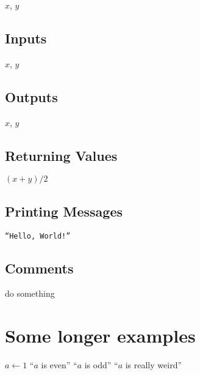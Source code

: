 \documentclass{amsart}
\begin{document}
\begin{algorithmic}[1]
    \GLOBALS $x$, $y$
\end{algorithmic}

\subsection{Inputs}

\begin{algorithmic}[1]
    \INPUTS
        \STATE $x$, $y$
    \ENDINPUTS
\end{algorithmic}

\subsection{Outputs}

\begin{algorithmic}[1]
    \OUTPUTS
        \STATE $x$, $y$
    \ENDOUTPUTS
\end{algorithmic}

\subsection{Returning Values}

\begin{algorithmic}[1]
\RETURN $(x+y)/2$
\end{algorithmic}

\subsection{Printing Messages}

\begin{algorithmic}[1]
\PRINT \texttt{``Hello, World!''}
\end{algorithmic}

\subsection{Comments}

\begin{algorithmic}[1]
\STATE do something 
\end{algorithmic}

\section{Some longer examples}

\begin{algorithmic}[1]
    \STATE $a \leftarrow 1$
        \PRINT ``$a$ is even''
        \PRINT ``$a$ is odd''
    \ELSE
        \PRINT ``$a$ is really weird''
    \ENDIF
\end{algorithmic}
\end{document}
